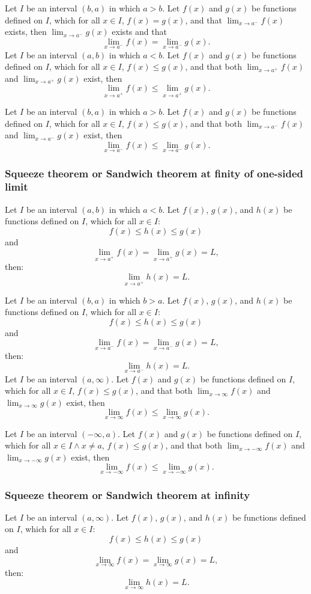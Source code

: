 \documentclass[a4paper,12pt]{report}
\begin{document}
Let \(I\) be an interval \((b,a)\) in which $a>b$. Let $f(x)$ and $g(x)$ be functions defined on \(I\), which for all $x\in I$, $f(x)=g(x)$, and that $\lim_{x\to a^-}f(x)$ exists, then $\lim_{x\to a^-}g(x)$ exists and that
\[\lim_{x\to a^-}f(x)=\lim_{x\to a^-}g(x).\]
Let \(I\) be an interval \((a,b)\) in which $a<b$. Let $f(x)$ and $g(x)$ be functions defined on \(I\), which for all $x\in I$, $f(x)\leq g(x)$, and that both $\lim_{x\to a^+}f(x)$ and $\lim_{x\to a^+}g(x)$ exist, then
\[\lim_{x\to a^+}f(x)\leq\lim_{x\to a^+}g(x).\]

Let \(I\) be an interval \((b,a)\) in which $a>b$. Let $f(x)$ and $g(x)$ be functions defined on \(I\), which for all $x\in I$, $f(x)\leq g(x)$, and that both $\lim_{x\to a^-}f(x)$ and $\lim_{x\to a^-}g(x)$ exist, then
\[\lim_{x\to a^-}f(x)\leq\lim_{x\to a^-}g(x).\]
\subsubsection{Squeeze theorem or Sandwich theorem at finity of one-sided limit}
Let \(I\) be an interval \((a,b)\) in which $a<b$. Let $f(x)$, $g(x)$, and $h(x)$ be functions defined on \(I\), which for all $x\in I$:
\[f(x)\leq h(x)\leq g(x)\]
and
\[\lim_{x\to a^+}f(x)=\lim_{x\to a^+}g(x)=L,\]
then: 
\[\lim_{x\to a^+}h(x)=L.\]

Let \(I\) be an interval \((b,a)\) in which $b>a$. Let $f(x)$, $g(x)$, and $h(x)$ be functions defined on \(I\), which for all $x\in I$:
\[f(x)\leq h(x)\leq g(x)\]
and
\[\lim_{x\to a^-}f(x)=\lim_{x\to a^-}g(x)=L,\]
then: 
\[\lim_{x\to a^-}h(x)=L.\]
Let \(I\) be an interval $(a,\infty)$. Let $f(x)$ and $g(x)$ be functions defined on \(I\), which for all $x\in I$, $f(x)\leq g(x)$, and that both $\lim_{x\to\infty}f(x)$ and $\lim_{x\to\infty}g(x)$ exist, then
\[\lim_{x\to\infty}f(x)\leq\lim_{x\to\infty}g(x).\]

Let \(I\) be an interval $(-\infty,a)$. Let $f(x)$ and $g(x)$ be functions defined on \(I\), which for all $x\in I\land x\neq a$, $f(x)\leq g(x)$, and that both $\lim_{x\to-\infty}f(x)$ and $\lim_{x\to-\infty}g(x)$ exist, then
\[\lim_{x\to-\infty}f(x)\leq\lim_{x\to-\infty}g(x).\]
\subsubsection{Squeeze theorem or Sandwich theorem at infinity}
Let \(I\) be an interval $(a,\infty)$. Let $f(x)$, $g(x)$, and $h(x)$ be functions defined on \(I\), which for all $x\in I$:
\[f(x)\leq h(x)\leq g(x)\]
and
\[\lim_{x\to\infty}f(x)=\lim_{x\to\infty}g(x)=L,\]
then: 
\[\lim_{x\to\infty}h(x)=L.\]
\end{document}
